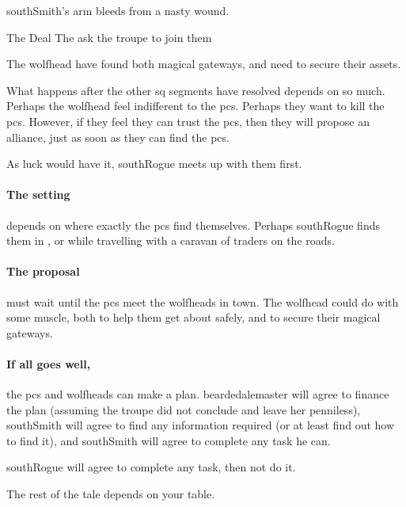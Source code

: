 
\setcounter{wounds}{5}

\southSmith

\Gls{southSmith}'s arm bleeds from a nasty wound.

\setcounter{wounds}{3}
\beardedalemaster

\southRogue

{The Deal}%
{The  ask the troupe to join them}%

The \gls{wolfhead} have found both magical gateways, and need to secure their assets.

What happens after the other \gls{sq} \glspl{segment} have resolved depends on so much.
Perhaps the \gls{wolfhead} feel indifferent to the \glspl{pc}.
Perhaps they want to kill the \glspl{pc}.
However, if they feel they can trust the \glspl{pc}, then they will propose an alliance, just as soon as they can find the \glspl{pc}.

As luck would have it, \gls{southRogue} meets up with them first.

\paragraph{The setting}
depends on where exactly the \glspl{pc} find themselves.
Perhaps \gls{southRogue} finds them in , or while travelling with a caravan of traders on the roads.

\paragraph{The proposal}
must wait until the \glspl{pc} meet the \glspl{wolfhead} in \gls{town}.
The \gls{wolfhead} could do with some muscle, both to help them get about safely, and to secure their magical gateways.

\paragraph{If all goes well,}
the \glspl{pc} and \glspl{wolfhead} can make a plan.
\Gls{beardedalemaster} will agree to finance the plan (assuming the troupe did not conclude  and leave her penniless), \gls{southSmith} will agree to find any information required (or at least find out how to find it), and \gls{southSmith} will agree to complete any task he can.

\Gls{southRogue} will agree to complete any task, then not do it.

The rest of the tale depends on your table.

